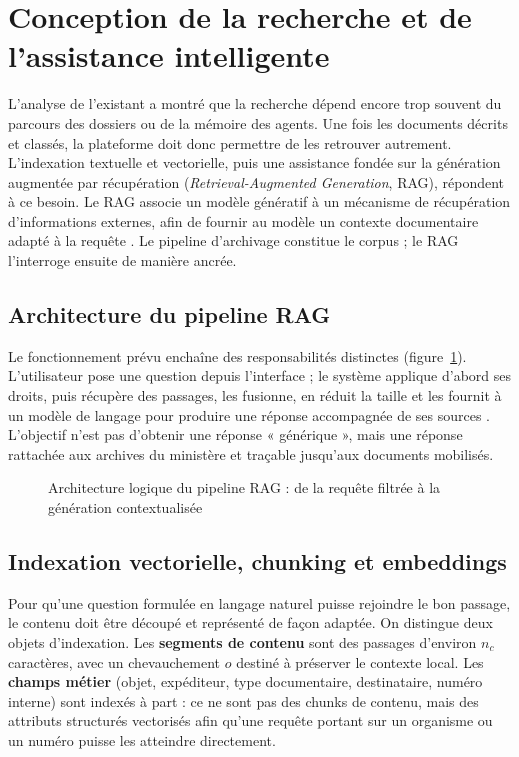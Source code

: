 \section{Conception de la recherche et de l'assistance intelligente}

L'analyse de l'existant a montré que la recherche dépend encore trop souvent du parcours des dossiers ou de la mémoire des agents. Une fois les documents décrits et classés, la plateforme doit donc permettre de les retrouver autrement. L'indexation textuelle et vectorielle, puis une assistance fondée sur la génération augmentée par récupération (\textit{Retrieval-Augmented Generation}, RAG), répondent à ce besoin. Le RAG associe un modèle génératif à un mécanisme de récupération d'informations externes, afin de fournir au modèle un contexte documentaire adapté à la requête . Le pipeline d'archivage constitue le corpus ; le RAG l'interroge ensuite de manière ancrée.

\subsection{Architecture du pipeline RAG}

Le fonctionnement prévu enchaîne des responsabilités distinctes (figure~\ref{fig:rag-pipeline}). L'utilisateur pose une question depuis l'interface ; le système applique d'abord ses droits, puis récupère des passages, les fusionne, en réduit la taille et les fournit à un modèle de langage pour produire une réponse accompagnée de ses sources . L'objectif n'est pas d'obtenir une réponse « générique », mais une réponse rattachée aux archives du ministère et traçable jusqu'aux documents mobilisés.

\begin{figure}[htbp]
\centering
\resizebox{\textwidth}{!}{}
\caption{Architecture logique du pipeline RAG : de la requête filtrée à la génération contextualisée}
\label{fig:rag-pipeline}
\end{figure}

\subsection{Indexation vectorielle, chunking et embeddings}

Pour qu'une question formulée en langage naturel puisse rejoindre le bon passage, le contenu doit être découpé et représenté de façon adaptée. On distingue deux objets d'indexation. Les \textbf{segments de contenu} sont des passages d'environ $n_{c}$ caractères, avec un chevauchement $o$ destiné à préserver le contexte local. Les \textbf{champs métier} (objet, expéditeur, type documentaire, destinataire, numéro interne) sont indexés à part : ce ne sont pas des chunks de contenu, mais des attributs structurés vectorisés afin qu'une requête portant sur un organisme ou un numéro puisse les atteindre directement.

